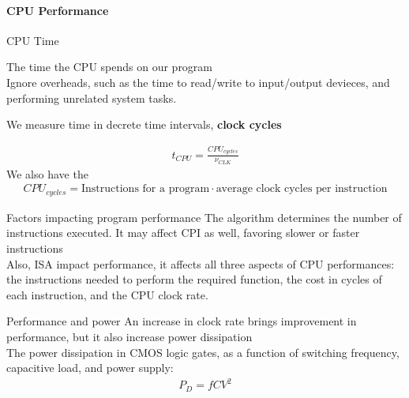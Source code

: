 \paragraph{CPU Performance}


\begin{parag}{CPU Time}
    \begin{definition}
    The time the CPU spends on our program\\
    Ignore overheads, such as the time to read/write to input/output devieces, and performing unrelated system tasks.
    \end{definition}
    We measure time in decrete time intervals, \textbf{clock cycles}

    \begin{align*} t_{CPU} = \frac{CPU_{cycles}}{\nu_{CLK}} \end{align*}
    We also have the 
    \begin{align*} CPU_{cycles} = \text{Instructions for a program} \cdot  \text{average clock cycles per instruction} \end{align*}
\end{parag}
\begin{parag}{Factors impacting program performance}
    The algorithm determines the number of instructions executed. It may affect CPI as well, favoring slower or faster instructions\\
    Also, ISA impact performance, it affects all three aspects of CPU performances: the instructions needed to perform the required function, the cost in cycles of each instruction, and the CPU clock rate.
    
\end{parag}


\begin{parag}{Performance and power}
    An increase in clock rate brings improvement in performance, but it also increase power dissipation\\
    The power dissipation in CMOS logic gates, as a function of switching frequency, capacitive load, and power supply:
    \begin{align*} P_D =   fCV^2 \end{align*}
\end{parag}























